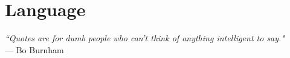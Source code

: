 \chapter{Language} \label{chap:language}

\begin{flushright}
    \textit{``Quotes are for dumb people who can’t think of anything intelligent to say."}
    \\--- Bo Burnham
\end{flushright}






